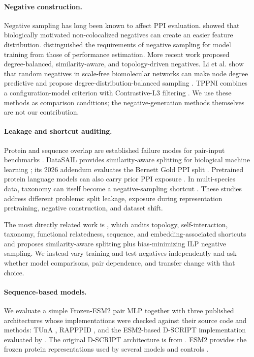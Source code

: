 \documentclass{article}
\begin{document}
\paragraph{Negative construction.}
Negative sampling has long been known to affect PPI evaluation.
\citet{benhur2006} showed that biologically motivated non-colocalized negatives
can create an easier feature distribution. \citet{park2011} distinguished the
requirements of negative sampling for model training from those of performance
estimation. More recent work proposed degree-balanced, similarity-aware, and
topology-driven negatives. Li et al. show that random negatives in scale-free
biomolecular networks can make node degree predictive and propose
degree-distribution-balanced sampling \citep{li2025ddb}. TPPNI combines a
configuration-model criterion with Contrastive-L3 filtering
\citep{chatterjee2025}. We use these methods as comparison conditions; the
negative-generation methods themselves are not our contribution.

\paragraph{Leakage and shortcut auditing.}
Protein and sequence overlap are established failure modes for pair-input
benchmarks \citep{park2012,bernett2024}. DataSAIL provides similarity-aware
splitting for biological machine learning \citep{joeres2025}; its 2026 addendum
evaluates the Bernett Gold PPI split \citep{joeres2026addendum}. Pretrained
protein language models can also carry prior PPI exposure
\citep{szymborski2026}. In multi-species data, taxonomy can itself become a
negative-sampling shortcut \citep{hallee2026}. These studies address different
problems: split leakage, exposure during representation pretraining, negative
construction, and dataset shift.

The most directly related work is \citet{bernett2026}, which audits topology,
self-interaction, taxonomy, functional relatedness, sequence, and
embedding-associated shortcuts and proposes similarity-aware splitting plus
bias-minimizing ILP negative sampling. We instead vary training and test
negatives independently and ask whether model comparisons, pair dependence,
and transfer change with that choice.

\paragraph{Sequence-based models.}
We evaluate a simple Frozen-ESM2 pair MLP together with three published
architectures whose implementations were checked against their source code and
methods: TUnA
\citep{ko2024}, RAPPPID \citep{szymborski2022}, and the ESM2-based D-SCRIPT
implementation evaluated by \citet{reim2025}. The original D-SCRIPT architecture
is from \citet{sledzieski2021}. ESM2 provides the frozen protein
representations used by several models and controls \citep{lin2023esm2}.
\end{document}

